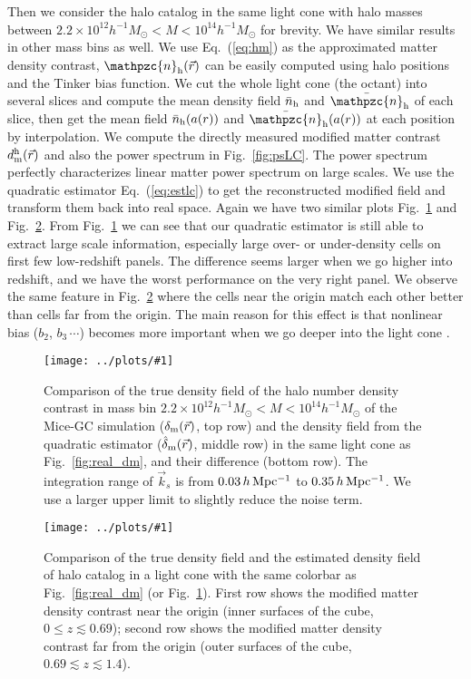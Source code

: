 \documentclass[prd,amsmath,amssymb,floatfix,superscriptaddress,nofootinbib,twocolumn]{revtex4-1}
\newcommand{\vrr}{\vec{r}}
\newcommand{\vk}{\vec{k}}
\newcommand{\ec}[1]{Eq.~(\ref{eq:#1})}
\newcommand{\rf}[1]{\ref{fig:#1}}
\newcommand{\sfig}[2]{
\texttt{[image: ../plots/\#1]}
        }
\newcommand{\Sfig}[2]{
   \begin{figure}[thbp]
   \begin{center}
    \sfig{../plots/#1.pdf}{\columnwidth}
    \caption{{\small #2}}
    \label{fig:#1}
     \end{center}
   \end{figure}
}
\begin{document}
Then we consider the halo catalog in the same light cone with halo masses between $2.2 \times 10^{12}h^{-1}M_{\odot}<M < 10^{14}h^{-1}M_{\odot}$ for brevity. We have similar results in other mass bins as well. We use \ec{hm} as the approximated matter density contrast, $\mathpzc{n}_{\rm h}(\vrr)$ can be easily computed using halo positions and the Tinker bias function. We cut the whole light cone (the octant) into several slices and compute the mean density field $\bar{{n}}_{\rm h}$ and $\bar{\mathpzc{n}}_{\rm h}$ of each slice, then get the mean field  $\bar{{n}}_{\rm h}(a(r))$ and $\bar{\mathpzc{n}}_{\rm h}(a(r))$ at each position by interpolation. We compute the directly measured modified matter contrast $d_{\rm m}^{\rm h}(\vrr)$ and also the power spectrum in Fig.~\rf{psLC}. The power spectrum perfectly characterizes linear matter power spectrum on large scales. We use the quadratic estimator \ec{estlc} to get the reconstructed modified field and transform them back into real space. Again we have two similar plots Fig.~\rf{real_halo} and Fig.~\rf{cube_halo}. From Fig.~\rf{real_halo} we can see that our quadratic estimator is still able to extract large scale information, especially large over- or under-density cells on first few low-redshift panels. The difference seems larger when we go higher into redshift, and we have the worst performance on the very right panel. We observe the same feature in Fig.~\rf{cube_halo} where the cells near the origin match each other better than cells far from the origin. The main reason for this effect is that nonlinear bias ($b_{2}$, $b_{3}\,\cdots$) becomes more important when we go deeper into the light cone \cite{Lazeyras:2016nbs}.

\Sfig{real_halo}{Comparison of the true density field of the halo number density contrast in mass bin $2.2 \times 10^{12}h^{-1}M_{\odot}<M < 10^{14}h^{-1}M_{\odot}$ of the Mice-GC simulation ($\delta_{\rm m}(\vrr)$, top row) and the density field from the quadratic estimator ($\hat{\delta}_{\rm m}(\vrr)$, middle row) in the same light cone as Fig.~\rf{real_dm}, and their difference (bottom row). The integration range of $\vk_{s}$ is from $0.03\, h \rm \, Mpc^{-1}$ to $0.35\, h \rm \, Mpc^{-1}$. We use a larger upper limit to slightly reduce the noise term.} 
\Sfig{cube_halo}{Comparison of the true density field and the estimated density field of halo catalog in a light cone with the same colorbar as Fig.~\rf{real_dm} (or Fig.~\rf{real_halo}). First row shows the modified matter density contrast near the origin (inner surfaces of the cube, $0\leqslant z \lesssim 0.69$); second row shows the modified matter density contrast far from the origin (outer surfaces of the cube, $0.69\lesssim z \lesssim 1.4$).}
\end{document}

